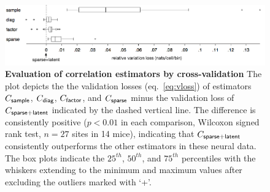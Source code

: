 \begin{figure}
\begin{fullpage}
        \begin{center}
        \includegraphics[width=\textwidth]{./figures/Figure4.pdf}
        \end{center}
\caption[Evaluation of correlation estimators by cross-validation]
{{\bf Evaluation of correlation estimators by cross-validation} 
The plot depicts the the validation losses (eq.~\ref{eq:vloss}) of estimators $C_{\sf sample}$, $C_{\sf diag}$, $C_{\sf factor}$, and $C_{\sf sparse}$ minus the validation loss of $C_{\sf sparse+latent}$ indicated by the dashed vertical line.
The difference is consistently positive ($p<0.01$ in each comparison, Wilcoxon signed rank test, $n=27$ sites in 14 mice), indicating that $C_{\sf sparse+latent}$  consistently outperforms the other estimators in these neural data.
The box plots indicate the $25^{th}$, $50^{th}$, and $75^{th}$ percentiles with the whiskers extending to the minimum and maximum values after excluding the outliers marked with `+'.
}\label{fig:4}
\end{fullpage}
\end{figure}
